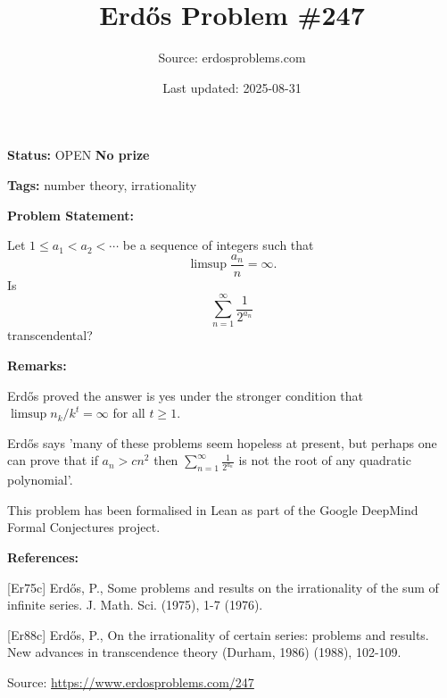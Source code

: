 \documentclass{article}
\title{Erd\H{o}s Problem \#247}
\date{Last updated: 2025-08-31}
\author{Source: erdosproblems.com}
\begin{document}
\maketitle

\noindent\textbf{Status:} OPEN \quad \textbf{No prize}

\noindent\textbf{Tags:} number theory, irrationality

\medskip
\noindent\textbf{Problem Statement:}

Let $1\leq a_1<a_2<\cdots$ be a sequence of integers such that\[\limsup \frac{a_n}{n}=\infty.\]Is\[\sum_{n=1}^\infty \frac{1}{2^{a_n}}\]transcendental?

\bigskip
\noindent\textbf{Remarks:}

Erd\H{o}s \cite{Er75c} proved the answer is yes under the stronger condition that $\limsup n_k/k^t=\infty$ for all $t\geq 1$.

Erd\H{o}s \cite{Er88c} says 'many of these problems seem hopeless at present, but perhaps one can prove that if $a_n>cn^2$ then $\sum_{n=1}^\infty \frac{1}{2^{a_n}}$ is not the root of any quadratic polynomial'.

This problem has been formalised in Lean as part of the Google DeepMind Formal Conjectures project.

\bigskip
\noindent\textbf{References:}

[Er75c] Erd\H{o}s, P., Some problems and results on the irrationality of the sum of infinite series. J. Math. Sci. (1975), 1-7 (1976).
 
 [Er88c] Erd\H{o}s, P., On the irrationality of certain series: problems and results. New advances in transcendence theory (Durham, 1986) (1988), 102-109.

\bigskip
\noindent\small{Source: \url{https://www.erdosproblems.com/247}}
\end{document}
